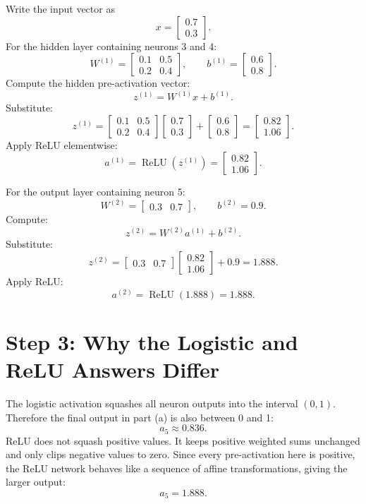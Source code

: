 \documentclass[11pt]{article}
\begin{document}
Write the input vector as
\[
x=
\begin{bmatrix}
0.7\\
0.3
\end{bmatrix}.
\]
For the hidden layer containing neurons 3 and 4:
\[
W^{(1)}=
\begin{bmatrix}
0.1 & 0.5\\
0.2 & 0.4
\end{bmatrix},
\qquad
b^{(1)}=
\begin{bmatrix}
0.6\\
0.8
\end{bmatrix}.
\]
Compute the hidden pre-activation vector:
\[
z^{(1)}=W^{(1)}x+b^{(1)}.
\]
Substitute:
\[
z^{(1)}
=
\begin{bmatrix}
0.1 & 0.5\\
0.2 & 0.4
\end{bmatrix}
\begin{bmatrix}
0.7\\
0.3
\end{bmatrix}
+
\begin{bmatrix}
0.6\\
0.8
\end{bmatrix}
=
\begin{bmatrix}
0.82\\
1.06
\end{bmatrix}.
\]
Apply ReLU elementwise:
\[
a^{(1)}=\operatorname{ReLU}(z^{(1)})
=
\begin{bmatrix}
0.82\\
1.06
\end{bmatrix}.
\]

For the output layer containing neuron 5:
\[
W^{(2)}=
\begin{bmatrix}
0.3 & 0.7
\end{bmatrix},
\qquad
b^{(2)}=0.9.
\]
Compute:
\[
z^{(2)}=W^{(2)}a^{(1)}+b^{(2)}.
\]
Substitute:
\[
z^{(2)}
=
\begin{bmatrix}
0.3 & 0.7
\end{bmatrix}
\begin{bmatrix}
0.82\\
1.06
\end{bmatrix}
+0.9
=1.888.
\]
Apply ReLU:
\[
a^{(2)}=\operatorname{ReLU}(1.888)=1.888.
\]

\section*{Step 3: Why the Logistic and ReLU Answers Differ}

The logistic activation squashes all neuron outputs into the interval $(0,1)$. Therefore the final output in part (a) is also between 0 and 1:
\[
a_5\approx 0.836.
\]
ReLU does not squash positive values. It keeps positive weighted sums unchanged and only clips negative values to zero. Since every pre-activation here is positive, the ReLU network behaves like a sequence of affine transformations, giving the larger output:
\[
a_5=1.888.
\]
\end{document}
